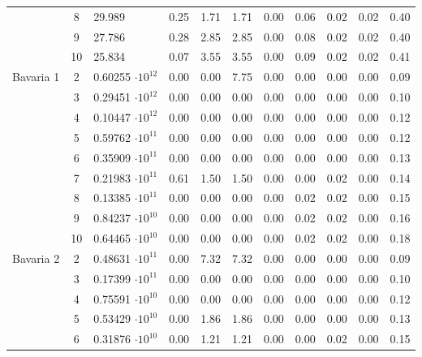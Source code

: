 {\begin{longtable}{@{}lclcccccccc@{}}
                      & 8  & 29.989          & 0.25    & 1.71  & 1.71  & 0.00  & 0.06    & 0.02 & 0.02 & 0.40  \\
                      & 9  & 27.786          & 0.28    & 2.85  & 2.85  & 0.00  & 0.08    & 0.02 & 0.02 & 0.40  \\
                      & 10 & 25.834          & 0.07    & 3.55  & 3.55  & 0.00  & 0.09    & 0.02 & 0.02 & 0.41  \\
Bavaria 1             & 2  & 0.60255 $\cdot 10^{12}$ & 0.00    & 0.00  & 7.75  & 0.00  & 0.00    & 0.00 & 0.00 & 0.09  \\
                      & 3  & 0.29451 $\cdot 10^{12}$ & 0.00    & 0.00  & 0.00  & 0.00  & 0.00    & 0.00 & 0.00 & 0.10  \\
                      & 4  & 0.10447 $\cdot 10^{12}$ & 0.00    & 0.00  & 0.00  & 0.00  & 0.00    & 0.00 & 0.00 & 0.12  \\
                      & 5  & 0.59762 $\cdot 10^{11}$ & 0.00    & 0.00  & 0.00  & 0.00  & 0.00    & 0.00 & 0.00 & 0.12  \\
                      & 6  & 0.35909 $\cdot 10^{11}$ & 0.00    & 0.00  & 0.00  & 0.00  & 0.00    & 0.00 & 0.00 & 0.13  \\
                      & 7  & 0.21983 $\cdot 10^{11}$ & 0.61    & 1.50  & 1.50  & 0.00  & 0.00    & 0.02 & 0.00 & 0.14  \\
                      & 8  & 0.13385 $\cdot 10^{11}$ & 0.00    & 0.00  & 0.00  & 0.00  & 0.02    & 0.02 & 0.00 & 0.15  \\
                      & 9  & 0.84237 $\cdot 10^{10}$ & 0.00    & 0.00  & 0.00  & 0.00  & 0.02    & 0.02 & 0.00 & 0.16  \\
                      & 10 & 0.64465 $\cdot 10^{10}$ & 0.00    & 0.00  & 0.00  & 0.00  & 0.02    & 0.02 & 0.00 & 0.18  \\
Bavaria 2             & 2  & 0.48631 $\cdot 10^{11}$ & 0.00    & 7.32  & 7.32  & 0.00  & 0.00    & 0.00 & 0.00 & 0.09  \\
                      & 3  & 0.17399 $\cdot 10^{11}$ & 0.00    & 0.00  & 0.00  & 0.00  & 0.00    & 0.00 & 0.00 & 0.10  \\
                      & 4  & 0.75591 $\cdot 10^{10}$ & 0.00    & 0.00  & 0.00  & 0.00  & 0.00    & 0.00 & 0.00 & 0.12  \\
                      & 5  & 0.53429 $\cdot 10^{10}$ & 0.00    & 1.86  & 1.86  & 0.00  & 0.00    & 0.00 & 0.00 & 0.13  \\
                      & 6  & 0.31876 $\cdot 10^{10}$ & 0.00    & 1.21  & 1.21  & 0.00  & 0.00    & 0.02 & 0.00 & 0.15  \\

\end{longtable}}
